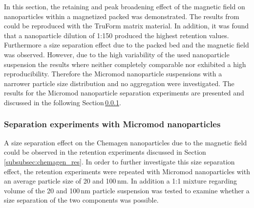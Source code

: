 In this section, the retaining and peak broadening effect of the magnetic field on nanoparticles within a magnetized packed was demonstrated. The results from \cite{AndreMaster} could be reproduced with the TruForm matrix material. In addition, it was found that a nanoparticle dilution of 1:150 produced the highest retention values. Furthermore a size separation effect due to the packed bed and the magnetic field was observed. However, due to the high variability of the used nanoparticle suspension the results where neither completely comparable nor exhibited a high reproducibility. Therefore the Micromod nanoparticle suspensions with a narrower particle size distribution and no aggregation were investigated. The results for the Micromod nanoparticle separation experiments are presented and discussed in the following Section\,\ref{subsubsec:micromod_res}. 

\FloatBarrier  
\subsubsection{Separation experiments with Micromod nanoparticles}
\label{subsubsec:micromod_res}
A size separation effect on the Chemagen nanoparticles due to the magnetic field could be observed in the retention experiments discussed in Section\,\ref{subsubsec:chemagen_res}. In order to further investigate this size separation effect, the retention experiments were repeated with Micromod nanoparticles with an average particle size of 20 and 100\,nm. In addition a 1:1 mixture regarding volume of the 20 and 100\,nm particle suspension was tested to examine whether a size separation of the two components was possible. 

